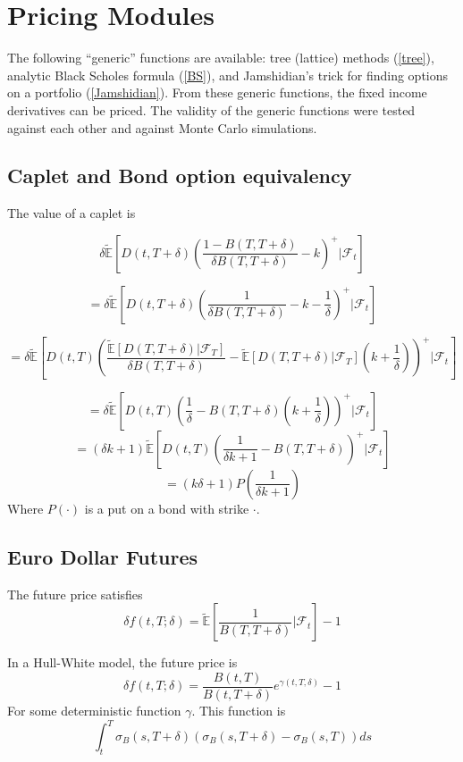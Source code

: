 \documentclass{article}
\theoremstyle{definition}
\begin{document}
\section{Pricing Modules}
The following ``generic'' functions are available: tree (lattice) methods (\ref{tree}), analytic Black Scholes formula (\ref{BS}), and Jamshidian's trick for finding options on a portfolio (\ref{Jamshidian}). From these generic functions, the fixed income derivatives can be priced. The validity of the generic functions were tested against each other and against Monte Carlo simulations.
\subsection{Caplet and Bond option equivalency}
 The value of a caplet is 
  
\[\delta\mathbb{\tilde{E}}\left[D(t, T+\delta)\left(\frac{1-B(T, T+\delta)}{\delta B(T, T+\delta)}-k\right)^+ |\mathcal{F}_t\right]\]

\[=\delta\mathbb{\tilde{E}}\left[D(t, T+\delta)\left(\frac{1}{\delta B(T, T+\delta)}-k-\frac{1}{\delta}\right)^+ |\mathcal{F}_t\right]\]
 
\[=\delta\mathbb{\tilde{E}}\left[D(t, T)\left(\frac{ \mathbb{\tilde{E}}[D(T, T+\delta)|\mathcal{F}_T]}{\delta B(T, T+\delta)}-\mathbb{\tilde{E}}[D(T, T+\delta)|\mathcal{F}_T]\left(k+\frac{1}{\delta}\right)\right)^+ |\mathcal{F}_t\right]\]

\[=\delta\mathbb{\tilde{E}}\left[D(t, T)\left(\frac{1}{\delta}-B(T, T+\delta)\left(k+\frac{1}{\delta}\right)\right)^+ |\mathcal{F}_t\right]\]
\[=\left(\delta k+1\right)\mathbb{\tilde{E}}\left[D(t, T)\left(\frac{1}{\delta k+1}-B(T, T+\delta)\right)^+ |\mathcal{F}_t\right]\]
\[=\left(k\delta+1\right)P\left(\frac{1}{\delta k +1}\right)\] Where \(P(\cdot)\) is a put on a bond with strike \(\cdot\).

\subsection{Euro Dollar Futures}
The future price satisfies \[\delta f(t, T; \delta)=\tilde{\mathbb{E}}\left[\frac{1}{B(T, T+\delta)}|\mathcal{F}_t\right]-1\]

In a Hull-White model, the future price is \[\delta f(t, T; \delta)=\frac{B(t, T)}{B(t, T+\delta)}e^{\gamma(t, T, \delta)}-1\]
For some deterministic function \(\gamma\).  This function is \[\int_t ^ T \sigma_B (s, T+\delta)\left(\sigma_B(s, T+\delta)-\sigma_B(s, T)\right)ds\]
\end{document}
